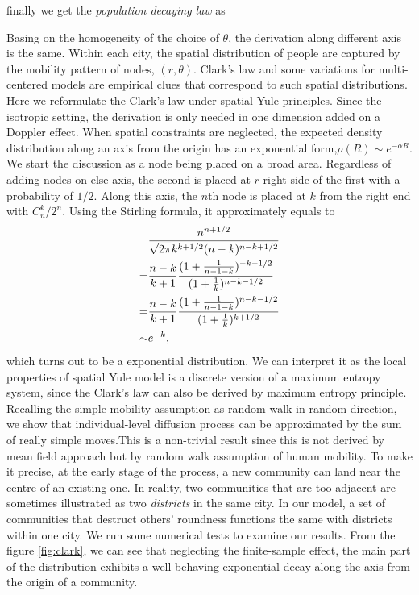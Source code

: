 \documentclass[aps,prl]{revtex4-1}
\begin{document}
finally we get the \emph{population decaying law} as 

Basing on the homogeneity of the choice of $\theta$, the derivation along different axis is the same. Within each city, the spatial distribution of people are captured by the mobility pattern of nodes, $(r,\theta)$. Clark's law\cite{clark1951urban} and some variations for multi-centered models\cite{griffith1981modelling} are empirical clues that correspond to such spatial distributions. Here we reformulate the Clark's law under spatial Yule principles. Since the isotropic setting, the derivation is only needed in one dimension added on a Doppler effect. When spatial constraints are neglected, the expected density distribution along an axis from the origin has an exponential form,$\rho (R)\sim e^{-\alpha R}$. We start the discussion as a node being placed on a broad area. Regardless of adding nodes on else axis, the second is placed at $r$ right-side of the first with a probability of $1/2$. Along this axis, the $n$th node is placed at $k$ from the right end with $C_n^k/2^n$. Using the Stirling formula, it approximately equals to \begin{align}
    & \frac{n^{n+1/2}}{\sqrt{2\pi}k^{k+1/2}(n-k)^{n-k+1/2}}\notag                         \\
=    & \frac{n-k}{k+1}\frac{(1+\frac{1}{n-1-k})^{-k-1/2}}{(1+\frac{1}{k})^{n-k-1/2}}\notag \\
=    & \frac{n-k}{k+1}\frac{(1+\frac{1}{n-1-k})^{n-k-1/2}}{(1+\frac{1}{k})^{k+1/2}}\notag  \\
\sim & e^{-k},
\end{align}
which turns out to be a exponential distribution. We can interpret it as the local properties of spatial Yule model is a discrete version of a maximum entropy system, since the Clark's law can also be derived by maximum entropy principle\cite{merity2009accurate}. Recalling the simple mobility assumption as random walk in random direction, we show that individual-level diffusion process can be approximated by the sum of really simple moves.This is a non-trivial result since this is not derived by mean field approach but by random walk assumption of human mobility. To make it precise, at the early stage of the process, a new community can land near the centre of an existing one. In reality, two communities that are too adjacent are sometimes illustrated as two \emph{districts} in the same city. In our model, a set of communities that destruct others' roundness functions the same with districts within one city. We run some numerical tests to examine our results. From the figure \ref{fig:clark}, we can see that neglecting the finite-sample effect, the main part of the distribution exhibits a well-behaving exponential decay along the axis from the origin of a community.
\end{document}
